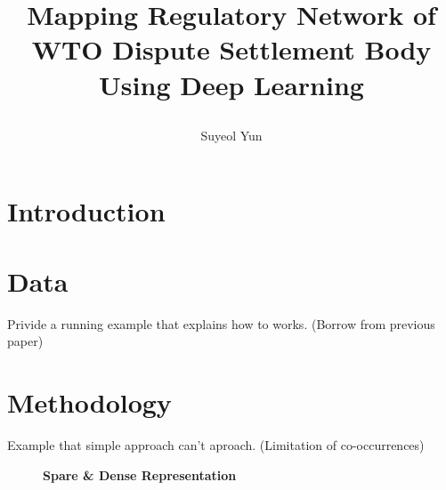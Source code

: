 \documentclass[12pt,letterpaper]{article}
\newcommand{\tit}{
\bf 
Mapping Regulatory Network of WTO Dispute Settlement Body Using Deep Learning
}
\newcommand\spacingset[1]{\renewcommand{\baselinestretch}
{#1}\small\normalsize}
\begin{document}
\spacingset{1.25}

\setcounter{page}{0}
\vspace{-.1in}

{\title{
    \tit
  }
  \author{Suyeol Yun
  }
  \maketitle
}

\thispagestyle{empty}
\vspace{-.1in}

\begin{abstract}
  \lipsum[1]
\end{abstract}

\spacingset{1.5} %

% 

\section{Introduction}










% 
% 

\section{Data}
Privide a running example that explains how to works. (Borrow from previous paper)

\section{Methodology}
Example that simple approach can't aproach. (Limitation of co-occurrences)

\begin{figure}[!tbp]
  \begin{subfigure}[b]{0.49\textwidth}
    \label{fig:f1}
  \end{subfigure}
  \hfill
  \begin{subfigure}[b]{0.49\textwidth}
    \label{fig:f2}
  \end{subfigure}
  \caption{\bf Spare \& Dense Representation}
\end{figure}
\end{document}
